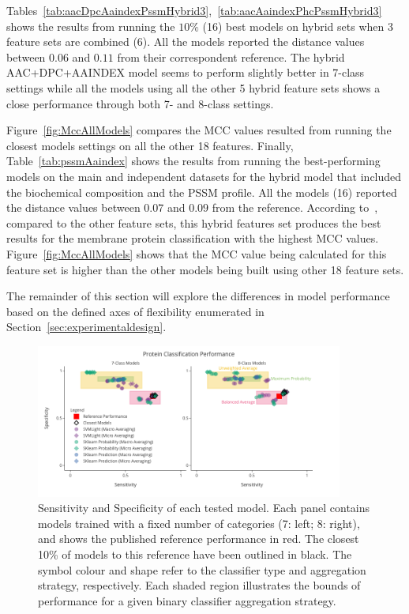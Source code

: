 Tables~\ref{tab:aacDpcAaindexPssmHybrid3},~\ref{tab:aacAaindexPhcPssmHybrid3} shows the results from running 
the $10\%$ (16) best models on hybrid sets when 3 feature sets are combined (6). All the models reported 
the distance values between $0.06$ and $0.11$ from their correspondent reference. The hybrid AAC+DPC+AAINDEX 
model seems to perform slightly better in 7-class settings while all the models using all the other 5 hybrid 
feature sets shows a close performance through both 7- and 8-class settings.

Figure~\ref{fig:MccAllModels} compares the MCC values resulted 
from running the closest models settings on all the other 18 features. Finally, Table~\ref{tab:pssmAaindex} 
shows the results from running the best-performing models on the main and independent datasets for the 
hybrid model that included the biochemical composition and the PSSM profile. All the models (16) reported 
the distance values between $0.07$ and $0.09$ from the reference. According to~\cite{mishra_prediction_2014},
compared to the other feature sets, this hybrid features set produces the best results for the 
membrane protein classification with the highest MCC values. 
Figure~\ref{fig:MccAllModels} shows that the MCC value being calculated for this 
feature set is higher than the other models being built using other 18 feature sets.

The remainder of this section will explore the differences in model performance based on the defined axes of
flexibility enumerated in Section~\ref{sec:experimentaldesign}.

\begin{figure}[ht]
    \centering
    \includegraphics[width=0.90\textwidth]{figures/14ModelPerformance.png}
    \caption{Sensitivity and Specificity of each tested model. Each panel contains models 
    trained with a fixed number of categories (7: left; 8: right), and shows the published 
    reference performance in red. The closest 10\% of models to this reference have been 
    outlined in black. The symbol colour and shape refer to the classifier type and aggregation 
    strategy, respectively. Each shaded region illustrates the bounds of performance for a given 
    binary classifier aggregation strategy.}
    \label{fig:modelPerformance}
\end{figure}

